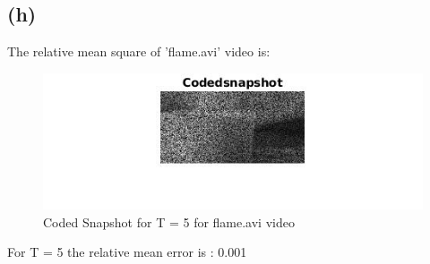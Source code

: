 \documentclass{article}
\begin{document}
\subsection{(h)}
The relative mean square of 'flame.avi' video is: 
\begin{figure}[ht]
\centering
\includegraphics[width=1\textwidth]{flame/coded.jpg}
\caption{Coded Snapshot for T = 5 for flame.avi video}
\end{figure}
For T = 5 the relative mean error is : 0.001
\end{document}

